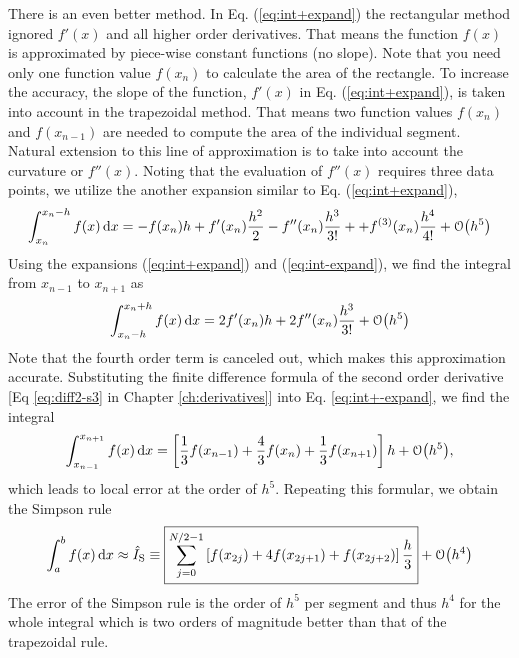 There is an even better method.
In Eq. (\ref{eq:int+expand}) the rectangular method ignored $f'(x)$ and all higher order derivatives.  That means the function $f(x)$ is approximated by piece-wise constant functions (no slope). Note that you need only one function value $f(x_n)$ to calculate the area of the rectangle.  To increase the accuracy, the slope of the function, $f'(x)$ in Eq. (\ref{eq:int+expand}), is taken into account in the trapezoidal method. That means two function values $f(x_n)$ and $f(x_{n-1})$ are needed to compute the area of the individual segment.  Natural extension to this line of approximation is to take into account the curvature or $f''(x)$.  Noting that the evaluation of $f''(x)$ requires three data points, we utilize the another expansion similar to Eq. (\ref{eq:int+expand}),
\begin{equation}\label{eq:int-expand}
\int_{x_{n}}^{x_{n}-h} f(x) \dd{x} = -f(x_n) h + f'(x_n) \frac{h^2}{2} - f''(x_n) \frac{h^3}{3!} + +f^{(3)}(x_n) \frac{h^4}{4!} + \order{h^5}
\end{equation}
Using the expansions (\ref{eq:int+expand}) and (\ref{eq:int-expand}), we find the integral from $x_{n-1}$ to $x_{n+1}$ as
\begin{equation}\label{eq:int+-expand}
\int_{x_n-h}^{x_n+h} f(x) \dd{x} = 2 f'(x_n) h + 2 f''(x_n) \frac{h^3}{3!} + \order{h^5}
\end{equation}
Note that the fourth order term is canceled out, which makes this approximation accurate.
Substituting the finite difference formula of the second order derivative [Eq \eqref{eq:diff2-s3} in Chapter \ref{ch:derivatives}] into Eq. \eqref{eq:int+-expand}, we find the integral 
\begin{equation}
\int_{x_{n-1}}^{x_{n+1}} f(x) \dd{x} = \left [ \frac{1}{3} f(x_{n-1})+ \frac{4}{3} f(x_n) + \frac{1}{3} f(x_{n+1}) \right ] h + \order{h^5},
\end{equation}
which leads to local error at the order of $h^5$.
Repeating this formular, we obtain the Simpson rule
\begin{equation}\label{eq:simpson_rule}
\int_{a}^{b} f(x) \dd{x} \approx \hat{I}_\text{S} \equiv 
\fbox{$\displaystyle\sum_{j=0}^{N/2-1} \left [ f(x_{2j})+4 f(x_{2j+1})+f(x_{2j+2}) \right ] \frac{h}{3}$} + \order{h^4}
\end{equation}
The error of the Simpson rule is the order of $h^5$ per segment and thus $h^4$ for the whole integral which is two orders of magnitude better than that of the trapezoidal rule.


